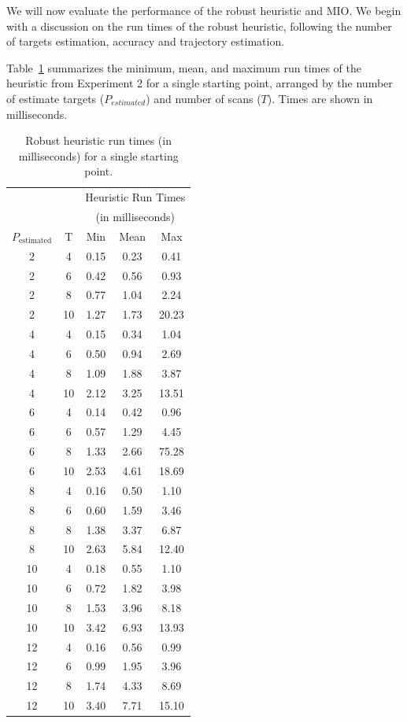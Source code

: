 We will now evaluate the performance of the robust heuristic and MIO. We begin with a discussion on the run times of the robust heuristic, following the number of targets estimation, accuracy and trajectory estimation.

 Table~\ref{tab:Robust_heuristic_times} summarizes the minimum, mean, and maximum run times of the heuristic from Experiment 2 for a single starting point, arranged by the number of estimate targets ($P_{estimated}$) and number of scans ($T$). Times are shown in milliseconds. 

\begin{table}[ht]
\centering
\begin{tabular}{cc|ccc}
  \hline
   & & \multicolumn{3}{c}{Heuristic Run Times } \\
   & & \multicolumn{3}{c}{(in milliseconds)}\\
   $ P_{\text{estimated}}$ & T & Min & Mean & Max \\ 
  \hline
  \hline
  2 & 4 & 0.15 & 0.23 & 0.41 \\ 
  2 & 6 & 0.42 & 0.56 & 0.93 \\ 
  2 & 8 & 0.77 & 1.04 & 2.24 \\ 
  2 & 10 & 1.27 & 1.73 & 20.23 \\ 
  4 & 4 & 0.15 & 0.34 & 1.04 \\ 
  4 & 6 & 0.50 & 0.94 & 2.69 \\ 
  4 & 8 & 1.09 & 1.88 & 3.87 \\ 
  4 & 10 & 2.12 & 3.25 & 13.51 \\ 
  6 & 4 & 0.14 & 0.42 & 0.96 \\ 
  6 & 6 & 0.57 & 1.29 & 4.45 \\ 
  6 & 8 & 1.33 & 2.66 & 75.28 \\ 
  6 & 10 & 2.53 & 4.61 & 18.69 \\ 
  8 & 4 & 0.16 & 0.50 & 1.10 \\ 
  8 & 6 & 0.60 & 1.59 & 3.46 \\ 
  8 & 8 & 1.38 & 3.37 & 6.87 \\ 
  8 & 10 & 2.63 & 5.84 & 12.40 \\ 
  10 & 4 & 0.18 & 0.55 & 1.10 \\ 
  10 & 6 & 0.72 & 1.82 & 3.98 \\ 
  10 & 8 & 1.53 & 3.96 & 8.18 \\ 
  10 & 10 & 3.42 & 6.93 & 13.93 \\ 
  12 & 4 & 0.16 & 0.56 & 0.99 \\ 
  12 & 6 & 0.99 & 1.95 & 3.96 \\ 
  12 & 8 & 1.74 & 4.33 & 8.69 \\ 
  12 & 10 & 3.40 & 7.71 & 15.10 \\ 
   \hline
\end{tabular}
\caption{Robust heuristic run times (in milliseconds) for a single starting point.}
\label{tab:Robust_heuristic_times}
\end{table}


